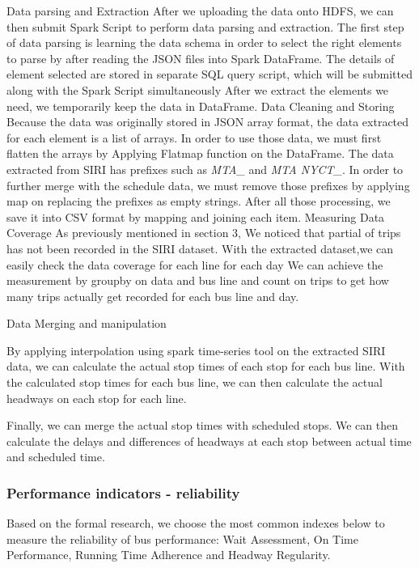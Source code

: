 \documentclass[12pt,journal,compsoc]{IEEEtran}
\begin{document}
Data parsing and Extraction
After we uploading the data onto HDFS, we can then submit Spark Script to perform data parsing and extraction.
The first step of data parsing is learning the data schema in order to select the right elements to parse by after  reading the JSON files into Spark DataFrame.
The details of element selected are stored in separate SQL query script, which will be submitted along with the Spark Script simultaneously
After we extract the elements we need, we temporarily keep the data in DataFrame.
Data Cleaning and Storing
Because the data was originally stored in JSON array format, the data extracted for each element is a list of arrays. In order to use those data, we must first flatten the arrays by Applying Flatmap function on the DataFrame.
The data extracted from SIRI has prefixes such as \textit{MTA\_} and \textit{MTA NYCT\_}. In order to further merge with the schedule data, we must remove those prefixes by applying map on replacing the prefixes as empty strings.
After all those processing, we save it into CSV format by mapping and joining each item.
Measuring Data Coverage
As previously mentioned in section 3, We noticed that partial of trips has not been recorded in the SIRI dataset. With the extracted dataset,we can easily check the data coverage for each line for each day
We can achieve the measurement by groupby on data and bus line and count on trips to get how many trips actually get recorded for each bus line and day. 

Data Merging and manipulation

By applying interpolation using spark time-series tool on the extracted SIRI data, we can calculate the actual stop times of each stop for each bus line. With the calculated stop times for each bus line, we can then calculate the actual headways on each stop for each line. 
 
Finally, we can merge the actual stop times with scheduled stops. We can then calculate the delays and differences of headways at each stop between actual time and scheduled time. 

\subsubsection{Performance indicators - reliability}

Based on the formal research, we choose the most common indexes below to measure the reliability of bus performance: Wait Assessment, On Time Performance, Running Time Adherence and Headway Regularity.
\end{document}
